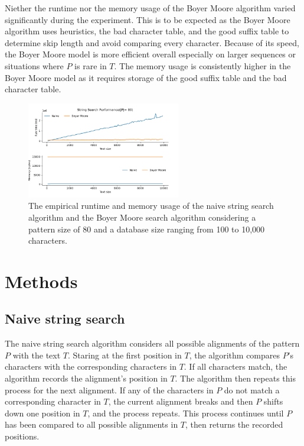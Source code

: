 \documentclass[11pt, letterpaper]{article}
\begin{document}
Niether the runtime nor the memory usage of the Boyer Moore algorithm varied 
significantly during the experiment. This is to be expected as the Boyer Moore 
algorithm uses heuristics, the bad character table, and the good suffix table 
to determine skip length and avoid comparing every character. Because of its
speed, the Boyer Moore model is more efficient overall especially on larger 
sequences or situations where $P$ is rare in $T$. The memory usage is 
consistently higher in the Boyer Moore model as it requires storage of the 
good suffix table and the bad character table. 

\begin{figure}[ht] \centering
    \includegraphics[width=0.6\textwidth]{results10000}
    \caption{The empirical runtime and memory usage of the naive string search
    algorithm and the Boyer Moore search algorithm considering a pattern size 
    of 80 and a database size ranging from 100 to 10,000 characters.}
    \label{timeandmem}
\end{figure}

\section{Methods}

\subsection{Naive string search}
The naive string search algorithm considers all possible alignments of the
pattern $P$ with the text $T$. Staring at the first position in $T$, the
algorithm compares $P$'s characters with the corresponding characters in $T$.
If all characters match, the algorithm records the alignment's position in $T$.
The algorithm then repeats this process for the next alignment. If any of the 
characters in $P$ do not match a corresponding character in $T$, the current
alignment breaks and then $P$ shifts down one position in $T$, and the process
repeats. This process continues until $P$ has been compared to all possible
alignments in $T$, then returns the recorded positions.
\end{document}
